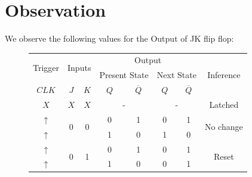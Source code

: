 \section{Observation}
We observe the following values for the Output of JK flip flop:
\begin{figure}
	\centering
			\begin{tabular}{|c|cc|cccc|c|}
				\hline
				\multirow{2}{*}{Trigger} & \multicolumn{2}{c|}{\multirow{2}{*}{Inputs}}                 & \multicolumn{4}{c|}{Output}                                                                                & \multirow{3}{*}{Inference} \\ \cline{4-7}
				& \multicolumn{2}{c|}{}                                        & \multicolumn{2}{c|}{Present State}                             & \multicolumn{2}{c|}{Next State}           &                            \\ \cline{1-7}
				$CLK$                    & \multicolumn{1}{c|}{$J$}                & $K$                & \multicolumn{1}{c|}{$Q$} & \multicolumn{1}{c|}{$\overline{Q}$} & \multicolumn{1}{c|}{$Q$} & $\overline{Q}$ &                            \\ \hline
				$X$                      & \multicolumn{1}{c|}{$X$}                & $X$                & \multicolumn{2}{c|}{-}                                         & \multicolumn{2}{c|}{-}                    & Latched                    \\ \hline
				$\uparrow$               & \multicolumn{1}{c|}{\multirow{2}{*}{0}} & \multirow{2}{*}{0} & \multicolumn{1}{c|}{0}   & \multicolumn{1}{c|}{1}              & \multicolumn{1}{c|}{0}   & 1              & \multirow{2}{*}{No change} \\ \cline{1-1} \cline{4-7}
				$\uparrow$               & \multicolumn{1}{c|}{}                   &                    & \multicolumn{1}{c|}{1}   & \multicolumn{1}{c|}{0}              & \multicolumn{1}{c|}{1}   & 0              &                            \\ \hline
				$\uparrow$               & \multicolumn{1}{c|}{\multirow{2}{*}{0}} & \multirow{2}{*}{1} & \multicolumn{1}{c|}{0}   & \multicolumn{1}{c|}{1}              & \multicolumn{1}{c|}{0}   & 1              & \multirow{2}{*}{Reset}     \\ \cline{1-1} \cline{4-7}
				$\uparrow$               & \multicolumn{1}{c|}{}                   &                    & \multicolumn{1}{c|}{1}   & \multicolumn{1}{c|}{0}              & \multicolumn{1}{c|}{0}   & 1              &                            \\ \hline

\end{tabular}
\end{figure}

